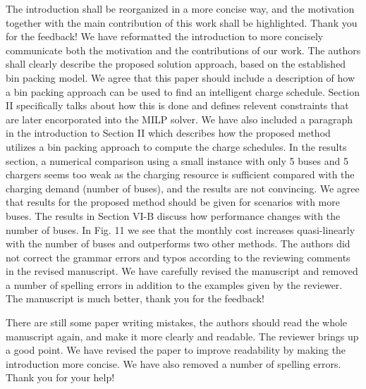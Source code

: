 \documentclass{article}
\begin{document}
\begin{buttkissing}
	\reviewerclaims The introduction shall be reorganized in a more concise way, and the motivation together with the main contribution of this work shall be highlighted.
	\kissbutt Thank you for the feedback!  We have reformatted the introduction to more concisely communicate both the motivation and the contributions of our work.
	\reviewerclaims The authors shall clearly describe the proposed solution approach, based on the established bin packing model.
	\kissbutt We agree that this paper should include a description of how a bin packing approach can be used to find an intelligent charge schedule. Section II specifically talks about how this is done and defines relevent constraints that are later encorporated into the MILP solver. We have also included a paragraph in the introduction to Section II which describes how the proposed method utilizes a bin packing approach to compute the charge schedules.
	\reviewerclaims In the results section, a numerical comparison using a small instance with only 5 buses and 5 chargers seems too weak as the charging resource is sufficient compared with the charging demand (number of buses), and the results are not convincing.
	\kissbutt We agree that results for the proposed method should be given for scenarios with more buses. The results in Section VI-B discuss how performance changes with the number of buses. In Fig. 11 we see that the monthly cost increases quasi-linearly with the number of buses and outperforms two other methods.
	\reviewerclaims The authors did not correct the grammar errors and typos according to the reviewing comments in the revised manuscript.
	\kissbutt We have carefully revised the manuscript and removed a number of spelling errors in addition to the examples given by the reviewer. The manuscript is much better, thank you for the feedback!
\end{buttkissing} 

\begin{buttkissing}
	\reviewerclaims  There are still some paper writing mistakes, the authors should read the whole manuscript again, and make it more clearly and readable.
	\kissbutt The reviewer brings up a good point. We have revised the paper to improve readability by making the introduction more concise. We have also removed a number of spelling errors. Thank you for your help!
\end{buttkissing}
\end{document}
